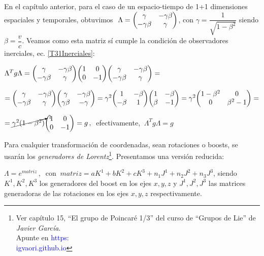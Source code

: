 \begin{example}

En el capítulo anterior, para el caso de un espacio-tiempo de 1+1 dimensiones espaciales y temporales, obtuvimos  $\ \Lambda=\mqty(\gamma&-\gamma \beta \\-\gamma\beta & \gamma)$, con $\gamma=\dfrac 1 {\sqrt{1-\beta^2}}$ siendo $\beta =\dfrac v c$. Veamos como esta matriz sí cumple la condición de observadores inerciales, ec. \ref{T31Inerciales}:

\vspace{5mm}
$\Lambda^T g \Lambda=
\mqty(\gamma&-\gamma \beta \\-\gamma\beta & \gamma) \mqty(1&0\\0&-1)\mqty(\gamma&-\gamma \beta \\-\gamma\beta & \gamma)=$

$=\mqty(\gamma&-\gamma \beta \\-\gamma\beta & \gamma)\mqty(\gamma&-\gamma \beta \\ \gamma\beta & -\gamma)=
\gamma^2 \mqty(1&-\beta \\ -\beta&1) \mqty(1&-\beta\\\beta&-1)=\gamma^2 \mqty(1-\beta^2&0\\0&\beta^2-1)=$

$=\cancelto{1}{\gamma^2 (1-\beta^2)}\mqty(1&0\\0&-1)=g\, , \ $ efectivamente, $\ \Lambda^T g \Lambda=g$
	
\end{example}


\vspace{1cm} Para cualquier transformación de coordenadas, sean rotaciones o boosts, se usarán los \emph{generadores de Lorentz}\footnote{ Ver capítulo 15, ``El grupo de Poincaré 1/3'' del curso de ``Grupos de Lie'' de \emph{Javier García}. \\ Apunte en \textcolor{blue}{https:\\igvaori.github.io}}. Presentamos una versión reducida:

$\Lambda = e^{matriz} \, , \ \text{ con } \ matriz=aK^1+bK^2+cK^3+n_1J^1+n_2J^2+n_3J^3$, siendo $K^1,K^2,K^3$ los generadores del boost en los ejes $x,y,z$ y $J^1,J^2,J^3$ las matrices generadoras de las rotaciones en los ejes $x,y,z$ respectivamente.




